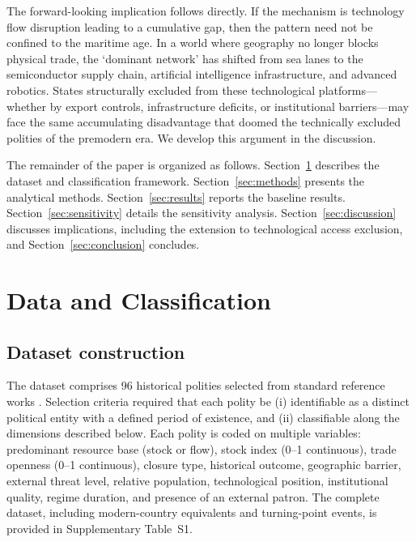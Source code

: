 \documentclass[pdflatex,sn-basic]{sn-jnl}
\theoremstyle{thmstyleone}%
\theoremstyle{thmstyletwo}%
\theoremstyle{thmstylethree}%
\begin{document}
The forward-looking implication follows directly. If the mechanism is technology flow disruption leading to a cumulative gap, then the pattern need not be confined to the maritime age. In a world where geography no longer blocks physical trade, the `dominant network' has shifted from sea lanes to the semiconductor supply chain, artificial intelligence infrastructure, and advanced robotics. States structurally excluded from these technological platforms---whether by export controls, infrastructure deficits, or institutional barriers---may face the same accumulating disadvantage that doomed the technically excluded polities of the premodern era. We develop this argument in the discussion.

The remainder of the paper is organized as follows. Section~\ref{sec:data} describes the dataset and classification framework. Section~\ref{sec:methods} presents the analytical methods. Section~\ref{sec:results} reports the baseline results. Section~\ref{sec:sensitivity} details the sensitivity analysis. Section~\ref{sec:discussion} discusses implications, including the extension to technological access exclusion, and Section~\ref{sec:conclusion} concludes.

\section{Data and Classification}\label{sec:data}

\subsection{Dataset construction}\label{sec:data-construction}

The dataset comprises 96 historical polities selected from standard reference works \citep{FindlayORourke2007, Kennedy1987, Turchin2009}. Selection criteria required that each polity be (i) identifiable as a distinct political entity with a defined period of existence, and (ii) classifiable along the dimensions described below. Each polity is coded on multiple variables: predominant resource base (stock or flow), stock index (0--1 continuous), trade openness (0--1 continuous), closure type, historical outcome, geographic barrier, external threat level, relative population, technological position, institutional quality, regime duration, and presence of an external patron. The complete dataset, including modern-country equivalents and turning-point events, is provided in Supplementary Table~S1.
\end{document}
